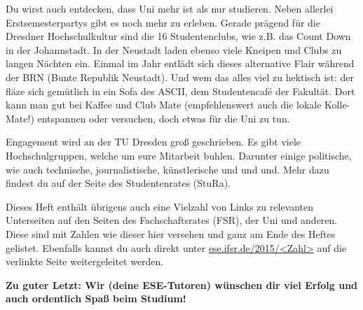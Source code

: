 Du wirst auch entdecken, dass Uni mehr ist als nur studieren. 
Neben allerlei Erstsemesterpartys gibt es noch mehr zu erleben. 
Gerade prägend für die Dresdner Hochschulkultur sind die 16 Studentenclubs, wie z.B. das Count Down in der Johannstadt. 
In der Neustadt laden ebenso viele Kneipen und Clubs zu langen Nächten ein. 
Einmal im Jahr entlädt sich dieses alternative Flair während der BRN (Bunte Republik Neustadt). 
Und wem das alles viel zu hektisch ist: der fläze sich gemütlich in ein Sofa des ASCII, dem Studentencafé der Fakultät. 
Dort kann man gut bei Kaffee und Club Mate (empfehlenswert auch die lokale Kolle-Mate!) entspannen oder versuchen, doch etwas für die Uni zu tun.

Engagement wird an der TU Dresden groß geschrieben. 
Es gibt viele Hochschulgruppen, welche um eure Mitarbeit buhlen. 
Darunter einige politische, wie auch technische, journalistische, künstlerische und und und. Mehr dazu findest du auf der Seite des Studentenrates (StuRa).

Dieses Heft enthält übrigens auch eine Vielzahl von Links zu relevanten Unterseiten auf den Seiten des Fachschaftsrates (FSR), der Uni und anderen. 
Diese sind mit Zahlen wie dieser hier  versehen und ganz am Ende des Heftes gelistet. Ebenfalls kannst du auch direkt unter \url{ese.ifsr.de/2015/<Zahl>} auf die verlinkte Seite weitergeleitet werden.

\textbf{Zu guter Letzt: Wir (deine ESE-Tutoren) wünschen dir viel Erfolg und auch ordentlich Spaß beim Studium!}
